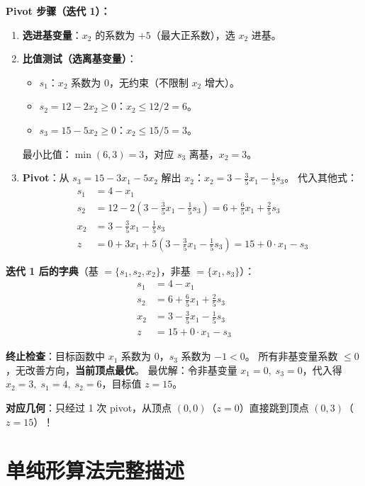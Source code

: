 \documentclass[UTF8,openany,12pt]{ctexbook}
\theoremstyle{remark}
\begin{document}
\noindent\textbf{Pivot 步骤（迭代 1）：}
\begin{enumerate}
  \item \textbf{选进基变量}：$x_2$ 的系数为 $+5$（最大正系数），选 $x_2$ 进基。
  \item \textbf{比值测试（选离基变量）}：
        \begin{itemize}
          \item $s_1$：$x_2$ 系数为 $0$，无约束（不限制 $x_2$ 增大）。
          \item $s_2=12-2x_2\ge0$：$x_2\le12/2=6$。
          \item $s_3=15-5x_2\ge0$：$x_2\le15/5=3$。
        \end{itemize}
        最小比值：$\min(6,3)=3$，对应 $s_3$ 离基，$x_2=3$。
  \item \textbf{Pivot}：从 $s_3=15-3x_1-5x_2$ 解出 $x_2$：$x_2=3-\frac{3}{5}x_1-\frac{1}{5}s_3$。
        代入其他式：
        \begin{align*}
          s_1 &= 4-x_1 \\
          s_2 &= 12-2\left(3-\tfrac{3}{5}x_1-\tfrac{1}{5}s_3\right) = 6+\tfrac{6}{5}x_1+\tfrac{2}{5}s_3\\
          x_2 &= 3-\tfrac{3}{5}x_1-\tfrac{1}{5}s_3 \\
          z   &= 0+3x_1+5\left(3-\tfrac{3}{5}x_1-\tfrac{1}{5}s_3\right)=15+0\cdot x_1-s_3
        \end{align*}
\end{enumerate}

\noindent\textbf{迭代 1 后的字典}（基 $=\{s_1,s_2,x_2\}$，非基 $=\{x_1,s_3\}$）：
\begin{align*}
  s_1 &= 4 - x_1 \\
  s_2 &= 6 + \tfrac{6}{5}x_1 + \tfrac{2}{5}s_3 \\
  x_2 &= 3 - \tfrac{3}{5}x_1 - \tfrac{1}{5}s_3 \\
  z   &= 15 + 0\cdot x_1 - s_3
\end{align*}

\noindent\textbf{终止检查}：目标函数中 $x_1$ 系数为 $0$，$s_3$ 系数为 $-1<0$。
所有非基变量系数 $\le0$，无改善方向，\textbf{当前顶点最优}。
最优解：令非基变量 $x_1=0,\;s_3=0$，代入得 $x_2=3,\;s_1=4,\;s_2=6$，目标值 $z=15$。

\noindent\textbf{对应几何}：只经过 1 次 pivot，从顶点 $(0,0)$（$z=0$）直接跳到顶点 $(0,3)$（$z=15$）！

\section{单纯形算法完整描述}
\end{document}
